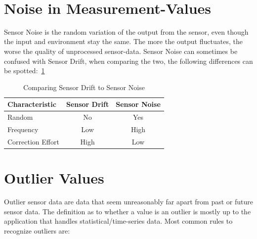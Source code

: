 \noindent\cite{LRWeb:13}\\

\section{Noise in Measurement-Values}\label{title:noise}
Sensor Noise is the random variation of the output from the sensor, even though the input and environment stay the same. The more the output fluctuates, the worse the quality of unprocessed sensor-data. Sensor Noise can sometimes be confused with Sensor Drift, when comparing the two, the following differences can be spotted:~\ref{tab:sensor-fault-comparison}

\begin{table}[h]
\centering
\begin{tabular}{lcc}
\toprule
\textbf{Characteristic} & \textbf{Sensor Drift} & \textbf{Sensor Noise}\\
\midrule
Random                      & No      & Yes             \\
Frequency                   & Low     & High            \\
Correction Effort           & High    & Low             \\

\bottomrule
\end{tabular}
\caption{Comparing Sensor Drift to Sensor Noise}\label{tab:sensor-fault-comparison}
\end{table}

\noindent\cite{LRWeb:19}

\section{Outlier Values}\label{title:outlier}
Outlier sensor data are data that seem unreasonably far apart from past or future sensor data. The definition as to whether a value is an outlier is mostly up to the application that handles statistical/time-series data. Most common rules to recognize outliers are:

